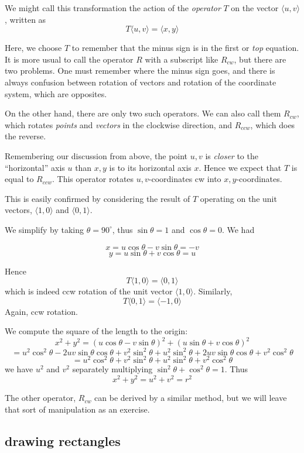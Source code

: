 \documentclass[11pt, oneside]{article}
\begin{document}
We might call this transformation the action of the \emph{operator} $T$ on the vector $\langle u,v \rangle$, written as
\[ T \langle u,v \rangle = \langle x,y \rangle \]

Here, we choose $T$ to remember that the minus sign is in the first or \emph{top} equation.  It is more usual to call the operator $R$ with a subscript like $R_{cw}$, but there are two problems.  One must remember where the minus sign goes, and there is always confusion between rotation of vectors and rotation of the coordinate system, which are opposites.

On the other hand, there are only two such operators.  We can also call them $R_{cw}$, which rotates \emph{points} and \emph{vectors} in the clockwise direction, and $R_{ccw}$, which does the reverse.  

Remembering our discussion from above, the point $u,v$ is \emph{closer} to the ``horizontal'' axis $u$ than $x,y$ is to its horizontal axis $x$.  Hence we expect that $T$ is equal to $R_{ccw}$.  This operator rotates $u,v$-coordinates cw into $x,y$-coordinates.

This is easily confirmed by considering the result of $T$ operating on the unit vectors, $\langle 1,0 \rangle$ and $\langle 0,1 \rangle$.

We simplify by taking $\theta = 90^{\circ}$, thus $\sin \theta = 1$ and $\cos \theta = 0$.  We had

\[ x = u \cos \theta - v \sin \theta = -v \]
\[ y = u \sin \theta + v \cos \theta = u \]

Hence
\[ T \langle 1,0 \rangle = \langle 0,1 \rangle \]
which is indeed ccw rotation of the unit vector $\langle 1,0 \rangle$.  Similarly, 
\[ T \langle 0,1 \rangle = \langle -1,0 \rangle \]
Again, ccw rotation.

We compute the square of the length to the origin:
\[ x^2 + y^2 = (u \cos \theta - v \sin \theta)^2 + (u \sin \theta + v \cos \theta)^2 \]
\[ = u^2 \cos^2 \theta - 2uv \sin \theta \cos \theta + v^2 \sin^2 \theta + u^2 \sin^2 \theta + 2uv \sin \theta \cos \theta + v^2 \cos^2 \theta \]
\[ = u^2 \cos^2 \theta + v^2 \sin^2 \theta + u^2 \sin^2 \theta  + v^2 \cos^2 \theta \]
we have $u^2$ and $v^2$ separately multiplying $\sin^2 \theta + \cos^2 \theta = 1$.  Thus
\[ x^2 + y^2 = u^2 + v^2 = r^2 \]

The other operator, $R_{cw}$ can be derived by a similar method, but we will leave that sort of manipulation as an exercise.

\subsection*{drawing rectangles}
\end{document}
